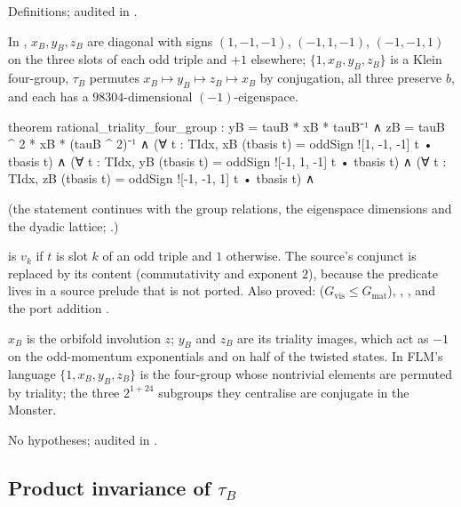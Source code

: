 \begin{status}
Definitions; audited in .
\end{status}
\begin{theorem}\label{ch21:thm:fourgroup}
In , $x_B,y_B,z_B$ are diagonal with signs $(1,-1,-1)$, $(-1,1,-1)$, $(-1,-1,1)$ on the
three slots of each odd triple and $+1$ elsewhere; $\{1,x_B,y_B,z_B\}$ is a Klein four-group, $\tau_B$
permutes $x_B\mapsto y_B\mapsto z_B\mapsto x_B$ by conjugation, all three preserve $b$, and each has
a $98304$-dimensional $(-1)$-eigenspace.
\end{theorem}
\begin{leancode}
theorem rational_triality_four_group :
    yB = tauB * xB * tauB⁻¹ ∧ zB = tauB ^ 2 * xB * (tauB ^ 2)⁻¹ ∧
    (∀ t : TIdx, xB (tbasis t) = oddSign ![1, -1, -1] t • tbasis t) ∧
    (∀ t : TIdx, yB (tbasis t) = oddSign ![-1, 1, -1] t • tbasis t) ∧
    (∀ t : TIdx, zB (tbasis t) = oddSign ![-1, -1, 1] t • tbasis t) ∧
\end{leancode}
(the statement continues with the group relations, the eigenspace dimensions and the dyadic
lattice; .)
\begin{dictionary}
 is $v_k$ if $t$ is slot $k$ of an odd triple and $1$ otherwise.  The source's conjunct
 is replaced by its content (commutativity and exponent $2$),
because the predicate lives in a source prelude that is not ported.  Also proved: 
($G_{\mathrm{vis}}\le G_{\mathrm{mat}}$), , , and the port
addition .
\end{dictionary}
\begin{physics}
$x_B$ is the orbifold involution $z$; $y_B$ and $z_B$ are its triality images, which act as $-1$ on
the odd-momentum exponentials and on half of the twisted states.  In FLM's language $\{1,x_B,y_B,z_B\}$
is the four-group whose nontrivial elements are permuted by triality; the three $2^{1+24}$ subgroups
they centralise are conjugate in the Monster.
\end{physics}
\begin{status}
No hypotheses; audited in .
\end{status}

\subsection{Product invariance of \texorpdfstring{$\tau_B$}{tauB}}

